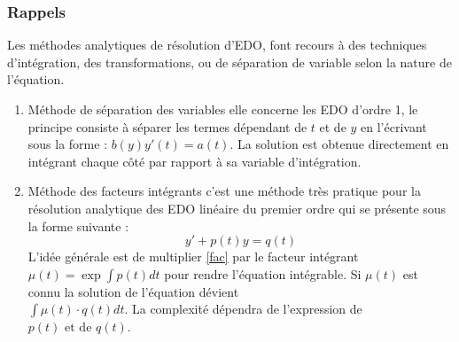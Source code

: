 \documentclass[12pt, oneside]{report} %
\newcommand{\R}{\mathbb{R}} %
\theoremstyle{definition}
\theoremstyle{remark}
\newtheorem*{nb}{\textbf{NB : }}
\begin{document}
	\subsubsection{Rappels}
	\label{sub: maedo}
	
Les méthodes analytiques de résolution d'EDO, font recours à des techniques d'intégration, des transformations, ou de séparation de variable selon la nature de l'équation.
\begin{enumerate}
	\item {Méthode de séparation des variables} elle concerne les EDO d'ordre 1, le principe consiste à séparer les termes dépendant de $t$ et de $y$ en l'écrivant sous la forme : $b({y}){y'}(t) = a(t)$. La solution est obtenue directement en intégrant chaque côté par rapport à sa variable d'intégration. 
	\item {Méthode des facteurs intégrants} c'est une méthode très pratique pour la résolution analytique des EDO linéaire du premier ordre qui se présente sous la forme suivante : 
	\begin{equation} \label{fac}
		y'+ p(t)y = q(t)
	\end{equation}
	L'idée générale est de multiplier \eqref{fac} par le facteur intégrant $\mu(t) = \exp\int p(t)dt$ pour rendre l'équation intégrable. Si $\mu(t)$ est connu la solution de l'équation dévient \\ $\int\mu(t)\cdot q(t)dt$. La complexité dépendra de l'expression de $p(t) \text{ et de } q(t)  $.
	\end{enumerate}
	
\end{document}
